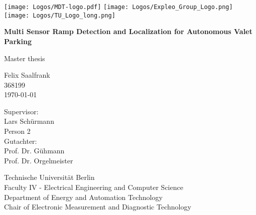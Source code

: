 \begin{titlepage}
	\begin{center} %
		\texttt{[image: Logos/MDT-logo.pdf]}
		\hspace*{0.5cm}
		\texttt{[image: Logos/Expleo\_Group\_Logo.png]}
		\hspace*{0.5cm}
		\texttt{[image: Logos/TU\_Logo\_long.png]}
		\vspace*{1cm} %

		\Huge
		\textbf{Multi Sensor Ramp Detection and Localization for Autonomous Valet Parking}

		\vspace{0.5cm}
		Master thesis

		\vspace{1.5cm}
		\LARGE{Felix Saalfrank}\\
		\large 368199\\
		\vspace{1cm}
		\today

		\vspace{1.5cm}

		Supervisor:\\
		Lars Sch\"urmann\\
		Person 2\\
		Gutachter:\\
		Prof. Dr. G\"uhmann\\
		Prof. Dr. Orgelmeister

		\vfill

		\vspace{0.8cm}

		Technische Universit\"at Berlin\\
		Faculty IV - Electrical Engineering and Computer Science\\
		Department of Energy and Automation Technology\\
		Chair of Electronic Measurement and Diagnostic Technology\\
	\end{center}
\end{titlepage}